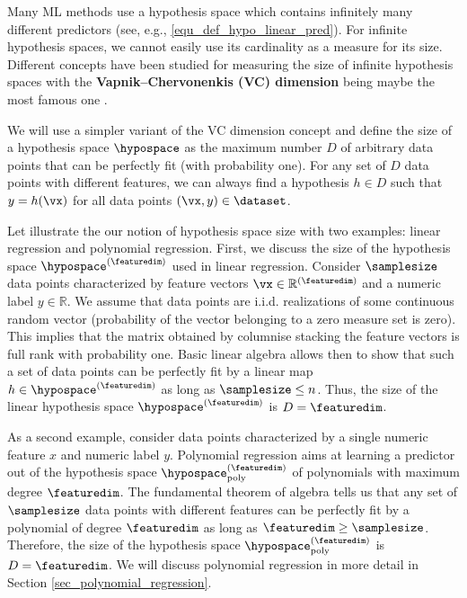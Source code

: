 \documentclass[12pt]{report}
\newcommand{\sizehypospace}{D}
\begin{document}
Many ML methods use a hypothesis space which contains infinitely many 
different predictors (see, e.g., \eqref{equ_def_hypo_linear_pred}). For infinite 
hypothesis spaces, we cannot easily use its cardinality as a measure for its size. 
Different concepts have been studied for measuring the size of infinite 
hypothesis spaces with the {\bf Vapnik–Chervonenkis (VC) dimension} being 
maybe the most famous one \cite{VapnikBook}. 

We will use a simpler variant of the VC dimension concept and define the size of a hypothesis 
space $\hypospace$ as the maximum number $\sizehypospace$ of arbitrary data points that 
can be perfectly fit (with probability one). For any set of $\sizehypospace$ data points with 
different features, we can always find a hypothesis $h \in \sizehypospace$ such that $y=h(\vx)$ 
for all data points $(\vx,y) \in \dataset$. 

Let illustrate the our notion of hypothesis space size with two examples: linear regression and 
polynomial regression. First, we discuss the size of the hypothesis space $\hypospace^{(\featuredim)}$ 
used in linear regression. Consider $\samplesize$ data points characterized by feature vectors 
$\vx \in \mathbb{R}^{(\featuredim)}$ and a numeric label $y \in \mathbb{R}$. We assume that 
data points are i.i.d. realizations of some continuous random vector (probability of the vector 
belonging to a zero measure set is zero). This implies that the matrix obtained by columnise 
stacking the feature vectors is full rank with probability one. Basic linear algebra allows then 
to show that such a set of data points can be perfectly fit by a linear map $h \in \hypospace^{(\featuredim)}$ 
as long as $\samplesize \leq n$. Thus, the size of the linear hypothesis space $\hypospace^{(\featuredim)}$
is $\sizehypospace = \featuredim$. 

As a second example, consider data points characterized by a single numeric feature $x$ and 
numeric label $y$. Polynomial regression aims at learning a predictor out of the 
hypothesis space $\hypospace_{\rm poly}^{(\featuredim)}$ of polynomials with 
maximum degree $\featuredim$. The fundamental theorem of algebra tells us that 
any set of $\samplesize$ data points with different features can be perfectly fit by a 
polynomial of degree $\featuredim$ as long as $\featuredim \geq \samplesize$. Therefore, 
the size of the hypothesis space $\hypospace_{\rm poly}^{(\featuredim)}$ is $\sizehypospace=\featuredim$. 
We will discuss polynomial regression in more detail in Section \ref{sec_polynomial_regression}. 
\end{document}
